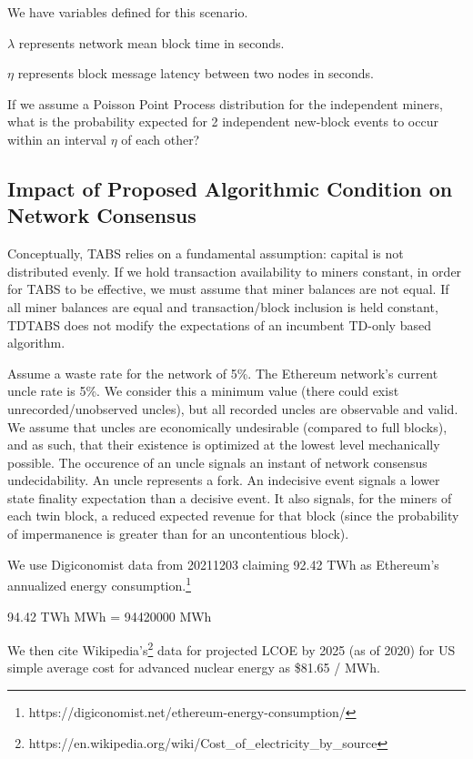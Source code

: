 \documentclass[11pt]{article}
\theoremstyle{plain}
\begin{document}
We have variables defined for this scenario.

$\lambda$ represents network mean block time in seconds.

$\eta$ represents block message latency between two nodes in seconds.

If we assume a Poisson Point Process distribution for the independent miners,
what is the probability expected for 2 independent new-block events to occur
within an interval $\eta$ of each other?


\subsection{\normalsize{Impact of Proposed Algorithmic Condition on Network
Consensus}}

Conceptually, TABS relies on a fundamental assumption: capital is not
distributed evenly.
If we hold transaction availability to miners constant, in order for TABS to be
effective, we must assume that miner balances are not equal.
If all miner balances are equal and transaction/block inclusion is held
constant, TDTABS does not modify the expectations of an incumbent TD-only based
algorithm.

Assume a waste rate for the network of 5\%.
The Ethereum network's current uncle rate is 5\%. We consider this a minimum
value (there could exist unrecorded/unobserved uncles), but all recorded uncles
are observable and valid.
We assume that uncles are economically undesirable (compared to full blocks),
and as such, that their existence is optimized at the lowest level mechanically
possible.
The occurence of an uncle signals an instant of network consensus
undecidability.
An uncle represents a fork.
An indecisive event signals a lower state finality expectation than a decisive
event.
It also signals, for the miners of each twin block, a reduced expected revenue
for that block (since the probability of impermanence is greater than for an
uncontentious block).

We use Digiconomist data from 20211203 claiming 92.42 TWh as Ethereum's
annualized energy
consumption.\footnote{https://digiconomist.net/ethereum-energy-consumption/}

94.42 TWh \rightarrow MWh = 94420000 MWh

We then cite
Wikipedia's\footnote{https://en.wikipedia.org/wiki/Cost_of_electricity_by_source
} data for projected LCOE by 2025 (as of 2020) for US simple average cost for
advanced nuclear energy as \$81.65 / MWh.
\end{document}
